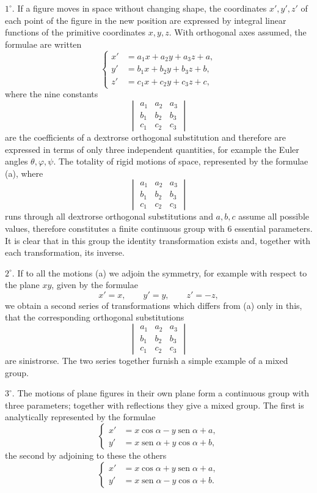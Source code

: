 \documentclass[11pt]{book}
\newcommand{\sen}{\operatorname{sen}}
\begin{document}
$1^{\circ}$. If a figure moves in space without changing shape, the coordinates $x',y',z'$ of each point of the figure in the new position are expressed by integral linear functions of the primitive coordinates $x,y,z$. With orthogonal axes assumed, the formulae are written
\[
\left\{
\begin{aligned}
 x'&=a_1x+a_2y+a_3z+a,\\
 y'&=b_1x+b_2y+b_3z+b,\\
 z'&=c_1x+c_2y+c_3z+c,
\end{aligned}\right.\tag{a}
\]
where the nine constants
\[
\begin{vmatrix}
 a_1&a_2&a_3\\
 b_1&b_2&b_3\\
 c_1&c_2&c_3
\end{vmatrix}
\]
are the coefficients of a dextrorse orthogonal substitution and therefore are expressed in terms of only three independent quantities, for example the Euler angles $\theta,\varphi,\psi$. The totality of rigid motions of space, represented by the formulae (a), where
\[
\begin{vmatrix}
 a_1&a_2&a_3\\
 b_1&b_2&b_3\\
 c_1&c_2&c_3
\end{vmatrix}
\]
runs through all dextrorse orthogonal substitutions and $a,b,c$ assume all possible values, therefore constitutes a finite continuous group with 6 essential parameters. It is clear that in this group the identity transformation exists and, together with each transformation, its inverse.

$2^{\circ}$. If to all the motions (a) we adjoin the symmetry, for example with respect to the plane $xy$, given by the formulae
\[
 x'=x,
 \qquad y'=y,
 \qquad z'=-z,
\]
we obtain a second series of transformations which differs from (a) only in this, that the corresponding orthogonal substitutions
\[
\begin{vmatrix}
 a_1&a_2&a_3\\
 b_1&b_2&b_3\\
 c_1&c_2&c_3
\end{vmatrix}
\]
are sinistrorse. The two series together furnish a simple example of a mixed group.

$3^{\circ}$. The motions of plane figures in their own plane form a continuous group with three parameters; together with reflections they give a mixed group. The first is analytically represented by the formulae
\[
\left\{
\begin{aligned}
 x'&=x\cos\alpha-y\sen\alpha+a,\\
 y'&=x\sen\alpha+y\cos\alpha+b,
\end{aligned}\right.
\]
the second by adjoining to these the others
\[
\left\{
\begin{aligned}
 x'&=x\cos\alpha+y\sen\alpha+a,\\
 y'&=x\sen\alpha-y\cos\alpha+b.
\end{aligned}\right.
\]
\end{document}
